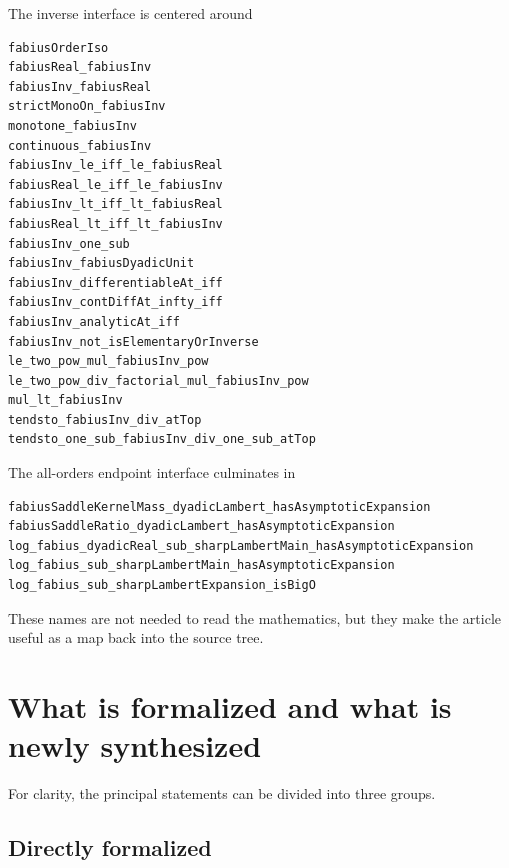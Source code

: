 \documentclass[11pt,oneside]{article}
\theoremstyle{definition}
\theoremstyle{remark}
\begin{document}
The inverse interface is centered around
\begin{lstlisting}[style=pseudo]
fabiusOrderIso
fabiusReal_fabiusInv
fabiusInv_fabiusReal
strictMonoOn_fabiusInv
monotone_fabiusInv
continuous_fabiusInv
fabiusInv_le_iff_le_fabiusReal
fabiusReal_le_iff_le_fabiusInv
fabiusInv_lt_iff_lt_fabiusReal
fabiusReal_lt_iff_lt_fabiusInv
fabiusInv_one_sub
fabiusInv_fabiusDyadicUnit
fabiusInv_differentiableAt_iff
fabiusInv_contDiffAt_infty_iff
fabiusInv_analyticAt_iff
fabiusInv_not_isElementaryOrInverse
le_two_pow_mul_fabiusInv_pow
le_two_pow_div_factorial_mul_fabiusInv_pow
mul_lt_fabiusInv
tendsto_fabiusInv_div_atTop
tendsto_one_sub_fabiusInv_div_one_sub_atTop
\end{lstlisting}
The all-orders endpoint interface culminates in
\begin{lstlisting}[style=pseudo]
fabiusSaddleKernelMass_dyadicLambert_hasAsymptoticExpansion
fabiusSaddleRatio_dyadicLambert_hasAsymptoticExpansion
log_fabius_dyadicReal_sub_sharpLambertMain_hasAsymptoticExpansion
log_fabius_sub_sharpLambertMain_hasAsymptoticExpansion
log_fabius_sub_sharpLambertExpansion_isBigO
\end{lstlisting}

These names are not needed to read the mathematics, but they make the
article useful as a map back into the source tree.

\section{What is formalized and what is newly synthesized}
\label{inverse:sec:status-ledger}

For clarity, the principal statements can be divided into three groups.

\subsection{Directly formalized}
\end{document}
